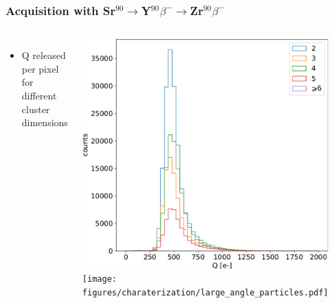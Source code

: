     \begin{frame}
        \frametitle{Acquisition with Sr$^{90}$$\rightarrow$Y$^{90}$$\beta^-$$\rightarrow$Zr$^{90}$$\beta^-$}
        \begin{columns}
                \begin{itemize}
                    \item Q released per pixel for different cluster dimensions
                \end{itemize}
                \bigskip
                \includegraphics[width=1.1\linewidth]{figures/charaterization/Sr90_spectrum_per_pixel.pdf} 
            \centering\texttt{[image: figures/charaterization/large\_angle\_particles.pdf]}
                \begin{figure}
                    \includegraphics[width=.3\linewidth]{figures/charaterization/evts/Sr90/18b.png}

\end{figure}
\end{columns}
\end{frame}
